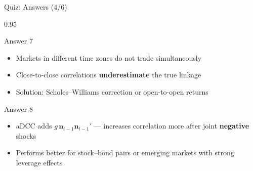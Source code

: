 \documentclass[9pt, aspectratio=169, t]{beamer}
\begin{document}
\begin{frame}{Quiz: Answers (4/6)}
    \begin{cminipage}{0.95\textwidth}
    {\scriptsize
    \begin{exampleblock}{Answer 7}
        \begin{itemize}\setlength{\itemsep}{0pt}
            \item Markets in different time zones do not trade simultaneously
            \item Close-to-close correlations \textbf{underestimate} the true linkage
            \item Solution: Scholes--Williams correction or open-to-open returns
        \end{itemize}
    \end{exampleblock}
    \begin{exampleblock}{Answer 8}
        \begin{itemize}\setlength{\itemsep}{0pt}
            \item aDCC adds $g\,\mathbf{n}_{t-1}\mathbf{n}_{t-1}'$ --- increases correlation more after joint \textbf{negative} shocks
            \item Performs better for stock--bond pairs or emerging markets with strong leverage effects
        \end{itemize}
    \end{exampleblock}
    }
    \end{cminipage}
\end{frame}
\end{document}
